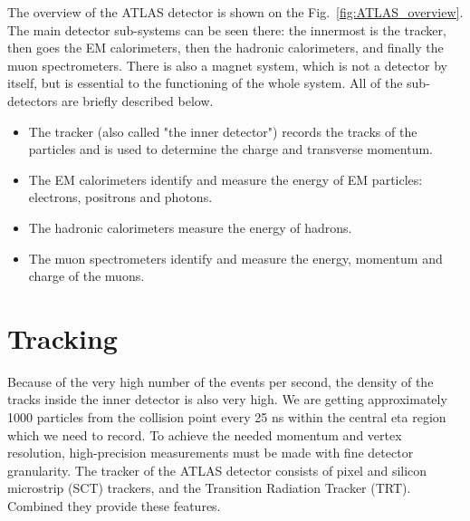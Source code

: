 The overview of the ATLAS detector is shown on the Fig.~\ref{fig:ATLAS_overview}. The main detector sub-systems can be seen there: the innermost is the tracker, then goes the EM calorimeters, then the hadronic calorimeters, and finally the muon spectrometers. There is also a magnet system, which is not a detector by itself, but is essential to the functioning of the whole system. All of the sub-detectors are briefly described below.

\begin{itemize}
\item The tracker (also called "the inner detector") records the tracks of the particles and is used to determine the charge and transverse momentum.
\item The EM calorimeters identify and measure the energy of EM particles: electrons, positrons and photons.
\item The hadronic calorimeters measure the energy of hadrons.
\item The muon spectrometers identify and measure the energy, momentum and charge of the muons.
\end{itemize}



\section{Tracking}
\label{sec:ATLAS_tracker}

Because of the very high number of the events per second, the density of the tracks inside the inner detector is also very high. We are getting approximately 1000 particles
from the collision point every 25 ns within the central eta region which we need to record. To achieve the needed momentum and vertex resolution, high-precision measurements must be made with fine detector granularity. The tracker of the ATLAS detector consists of pixel and silicon microstrip (SCT) trackers, and the Transition Radiation Tracker (TRT). Combined they provide these features.

\begin{figure}
\end{figure}

